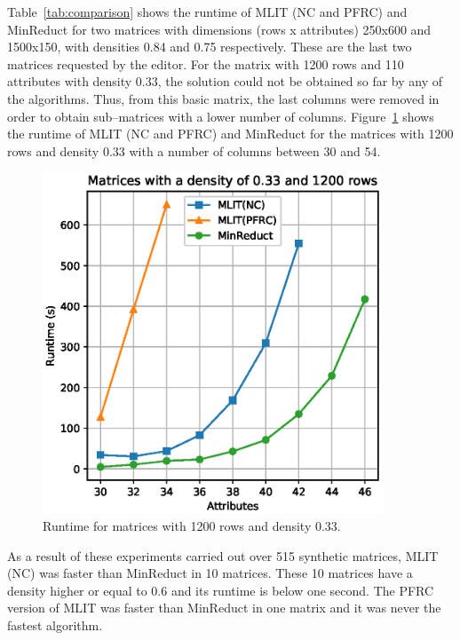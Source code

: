\documentclass[citenumber]{llncs}
\begin{document}
	Table~\ref{tab:comparison} shows the runtime of MLIT (NC and PFRC) and MinReduct for two matrices with dimensions (rows x attributes) 250x600 and 1500x150, with densities 0.84 and 0.75 respectively. These are the last two matrices requested by the editor. For the matrix with 1200 rows and 110 attributes with density 0.33, the solution could not be obtained so far by any of the algorithms. Thus, from this basic matrix, the last columns were removed in order to obtain sub--matrices with a lower number of columns. Figure~\ref{fig:1200x110}  shows the runtime of MLIT (NC and PFRC) and MinReduct for the matrices with 1200 rows and density 0.33 with a number of columns between 30 and 54. 
	
	\begin{figure}[hbt]
		\begin{center}
			\includegraphics[height=4in]{low_density_Minreduct_vs_MLIT.eps} 
		\end{center}
		\caption{Runtime for matrices with 1200 rows and density 0.33.}\label{fig:1200x110}
	\end{figure}  
	
	As a result of these experiments carried out over 515 synthetic matrices,  MLIT (NC) was faster than MinReduct in 10 matrices. These 10 matrices have a density higher or equal to 0.6 and its runtime is below one second. The PFRC version of MLIT was faster than MinReduct in one matrix and it was never the fastest algorithm. 
	
\end{document}
